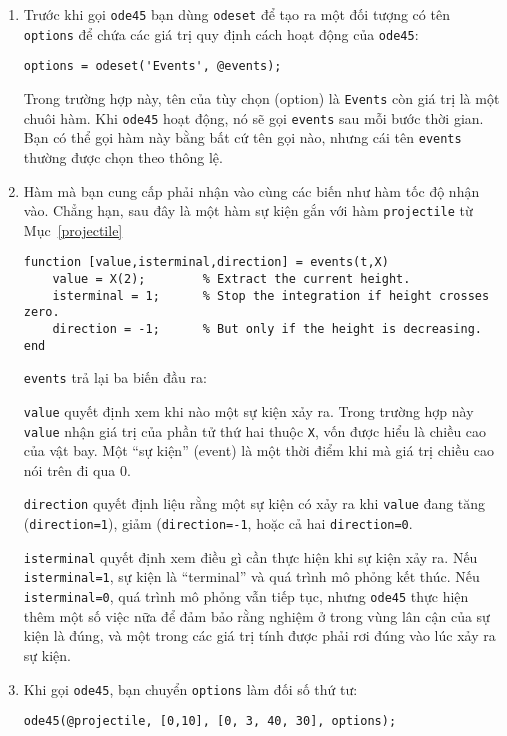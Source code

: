 \documentclass[12pt]{book}
\begin{document}
\begin{enumerate}

\item Trước khi gọi {\tt ode45} bạn dùng {\tt odeset} để tạo ra một
đối tượng có tên {\tt options} để chứa các giá trị quy định cách 
hoạt động của {\tt ode45}:

\begin{verbatim}
options = odeset('Events', @events);
\end{verbatim}
%
Trong trường hợp này, tên của tùy chọn (option) là {\tt Events} còn
giá trị là một chuôi hàm. Khi {\tt ode45} hoạt động, nó sẽ gọi
{\tt events} sau mỗi bước thời gian. Bạn có thể gọi hàm này bằng
bất cứ tên gọi nào, nhưng cái tên {\tt events} thường được chọn
theo thông lệ.

\item Hàm mà bạn cung cấp phải nhận vào cùng các biến như 
hàm tốc độ nhận vào. Chẳng hạn, sau đây là một hàm sự kiện 
gắn với hàm {\tt projectile} từ Mục~\ref{projectile}

\begin{verbatim}
function [value,isterminal,direction] = events(t,X)
    value = X(2);        % Extract the current height.
    isterminal = 1;      % Stop the integration if height crosses zero.
    direction = -1;      % But only if the height is decreasing.
end
\end{verbatim}
%
{\tt events} trả lại ba biến đầu ra:

{\tt value} quyết định xem khi nào một sự kiện xảy ra. Trong 
trường hợp này {\tt value} nhận giá trị của phần tử thứ hai thuộc
{\tt X}, vốn được hiểu là chiều cao của vật bay. Một ``sự kiện''
(event) là một thời điểm khi mà giá trị chiều cao nói trên đi qua 0.

{\tt direction} quyết định liệu rằng một sự kiện có xảy ra khi
{\tt value} đang tăng ({\tt direction=1}), giảm 
({\tt direction=-1}, hoặc cả hai {\tt direction=0}.

{\tt isterminal} quyết định xem điều gì cần thực hiện khi sự kiện
xảy ra. Nếu {\tt isterminal=1}, sự kiện là ``terminal'' và quá trình
mô phỏng kết thúc. Nếu {\tt isterminal=0}, quá trình mô phỏng
vẫn tiếp tục, nhưng {\tt ode45} thực hiện thêm một số việc nữa
để đảm bảo rằng nghiệm ở trong vùng lân cận của sự kiện là đúng,
và một trong các giá trị tính được phải rơi đúng vào lúc xảy ra
sự kiện.

\item Khi gọi {\tt ode45}, bạn chuyển {\tt options} làm đối số
thứ tư:

\begin{verbatim}
ode45(@projectile, [0,10], [0, 3, 40, 30], options);
\end{verbatim}
%
\end{enumerate}
\end{document}
